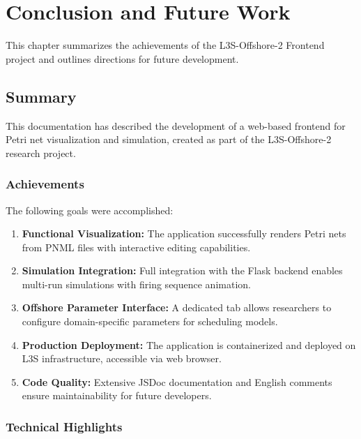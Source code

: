\chapter{Conclusion and Future Work}
\label{chap:conclusion}

This chapter summarizes the achievements of the L3S-Offshore-2 Frontend project and outlines directions for future development.

\section{Summary}
\label{sec:summary}

This documentation has described the development of a web-based frontend for Petri net visualization and simulation, created as part of the L3S-Offshore-2 research project.

\subsection{Achievements}

The following goals were accomplished:

\begin{enumerate}
    \item \textbf{Functional Visualization:} The application successfully renders Petri nets from PNML files with interactive editing capabilities.
    
    \item \textbf{Simulation Integration:} Full integration with the Flask backend enables multi-run simulations with firing sequence animation.
    
    \item \textbf{Offshore Parameter Interface:} A dedicated tab allows researchers to configure domain-specific parameters for scheduling models.
    
    \item \textbf{Production Deployment:} The application is containerized and deployed on L3S infrastructure, accessible via web browser.
    
    \item \textbf{Code Quality:} Extensive JSDoc documentation and English comments ensure maintainability for future developers.
\end{enumerate}

\subsection{Technical Highlights}

